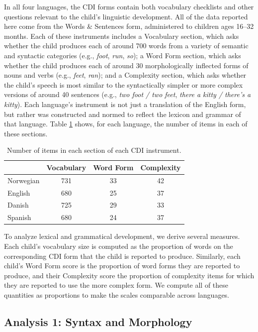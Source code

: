 \documentclass[10pt,letterpaper]{article}
\begin{document}
In all four languages, the CDI forms contain both vocabulary checklists and other questions relevant to the child's linguistic development. All of the data reported here come from the Words \& Sentences form, administered to children ages 16--32 months. Each of these instruments includes a Vocabulary section, which asks whether the child produces each of around 700 words from a variety of semantic and syntactic categories (e.g., \emph{foot}, \emph{run}, \emph{so}); a Word Form section, which asks whether the child produces each of around 30 morphologically inflected forms of nouns and verbs (e.g., \emph{feet}, \emph{ran}); and a Complexity section, which asks whether the child's speech is most similar to the syntactically simpler or more complex versions of around 40 sentences (e.g., \emph{two foot / two feet}, \emph{there a kitty / there's a kitty}). Each language's instrument is not just a translation of the English form, but rather was constructed and normed to reflect the lexicon and grammar of that language. Table \ref{table:measures} shows, for each language, the number of items in each of these sections.

\begin{table}
\begin{center}
\begin{tabular}{lccc}
\hline
& Vocabulary & Word Form & Complexity\\ 
\hline
Norwegian & 731 & 33 & 42\\ 
English & 680 & 25 & 37\\ 
Danish & 725 & 29 & 33\\ 
Spanish & 680 & 24 & 37\\ 
\hline
\end{tabular}
\end{center}
\caption{\label{table:measures} Number of items in each section of each CDI instrument.}
\end{table}

To analyze lexical and grammatical development, we derive several measures. Each child's vocabulary size is computed as the proportion of words on the corresponding CDI form that the child is reported to produce. Similarly, each child's Word Form score is the proportion of word forms they are reported to produce, and their Complexity score the proportion of complexity items for which they are reported to use the more complex form. We compute all of these quantities as proportions to make the scales comparable across languages.

\subsection{Analysis 1: Syntax and Morphology}
\end{document}
